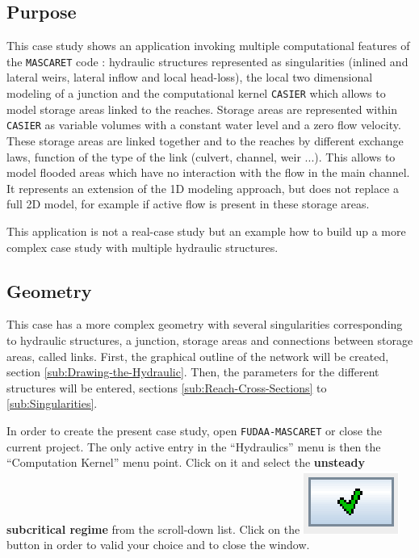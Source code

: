 \documentclass[a4paper,12pt]{article}
\begin{document}
\subsection{Purpose}

\hspace{0.5cm} This case study shows an application invoking multiple computational
features of the \texttt{MASCARET} code : hydraulic structures represented as
singularities (inlined and lateral weirs, lateral inflow and local
head-loss), the local two dimensional modeling of a junction and the
computational kernel \texttt{CASIER} which allows to model storage areas
linked to the reaches. Storage areas are represented within \texttt{CASIER}
as variable volumes with a constant water level and a zero flow velocity.
These storage areas are linked together and to the reaches by different
exchange laws, function of the type of the link (culvert, channel,
weir ...). This allows to model flooded areas which have no interaction
with the flow in the main channel. It represents an extension of the
1D modeling approach, but does not replace a full 2D model, for example
if active flow is present in these storage areas.

\vspace{0.5cm}

This application is not a real-case study but an example how to build
up a more complex case study with multiple hydraulic structures.


\subsection{Geometry}

\hspace{0.5cm} This case has a more complex geometry with several singularities corresponding
to hydraulic structures, a junction, storage areas and connections
between storage areas, called links. First, the graphical outline
of the network will be created, section \ref{sub:Drawing-the-Hydraulic}.
Then, the parameters for the different structures will be entered,
sections \ref{sub:Reach-Cross-Sections} to \ref{sub:Singularities}.

\vspace{0.5cm}

In order to create the present case study, open \texttt{FUDAA-MASCARET} or
close the current project. The only active entry in the {}``Hydraulics''
menu is then the {}``Computation Kernel'' menu point. Click on it
and select the \textbf{unsteady subcritical regime} from the scroll-down
list. Click on the \includegraphics[scale=0.6]{valid} button
in order to valid your choice and to close the window. 
\end{document}
